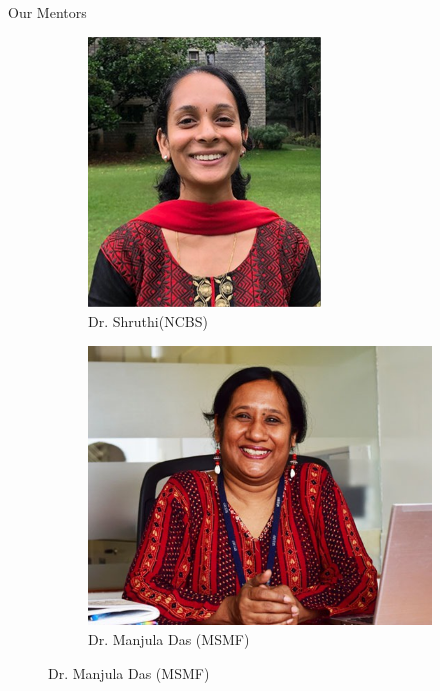 \begin{frame}{Our Mentors}
\begin{figure}[h]
\begin{subfigure}[b]{0.3\textwidth}
            \includegraphics[width=\textwidth]{images/shruthi.png}
            \caption{Dr. Shruthi(NCBS)}
            \label{fig:image1}
        \end{subfigure}
        \hfill
        \begin{subfigure}[b]{0.3\textwidth}
            \centering
            \includegraphics[width=\textwidth]{images/manjulamam.png}
            \caption{Dr. Manjula Das (MSMF)}
            \label{fig:image3}
        \end{subfigure}
    \end{figure}
\end{frame}